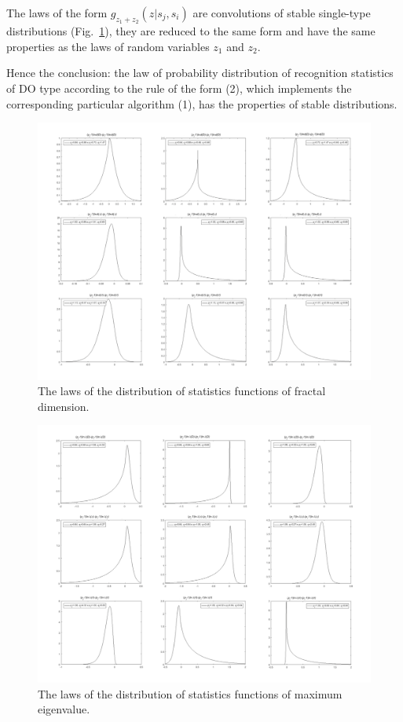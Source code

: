 The laws of the form ${{g}_{{{z}_{1}}+{{z}_{2}}}}(z|{{s}_{j}},{{s}_{i}})$ are convolutions of stable single-type distributions (Fig.~\ref{fig:fig_2}), they are reduced to the same form and have the same properties as the laws of random variables ${{z}_{1}}$ and ${{z}_{2}}$. 

Hence the conclusion: the law of probability distribution of recognition statistics of DO type according to the rule of the form (2), which implements the corresponding particular algorithm (1), has the properties of stable distributions. 


\begin{figure}[h]
\setcaptionmargin{5mm}
\onelinecaptionstrue
\includegraphics[width=1.0\textwidth]{pics/fig_2.pdf}
\caption{The laws of the distribution of statistics functions of fractal dimension.}\label{fig:fig_2}
\end{figure}

\begin{figure}[h]
\setcaptionmargin{5mm}
\onelinecaptionstrue
\includegraphics[width=1.0\textwidth]{pics/fig_3.pdf}
\caption{The laws of the distribution of statistics functions of maximum eigenvalue.}\label{fig:fig_3}
\end{figure}

